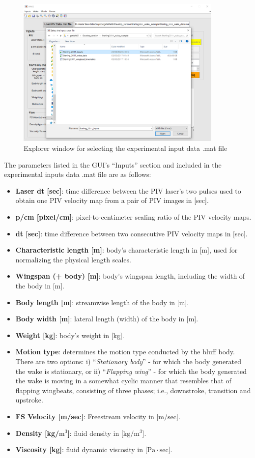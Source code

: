 \documentclass[12pt,a4paper]{article}
\begin{document}
\begin{figure}[ht!]
	\centering
	\includegraphics[width=0.9\textwidth]{select-inputs-mat-file}
	\caption{Explorer window for selecting the experimental input data .mat file}
	\label{fig:GUI-Select-inputs-mat-file}
\end{figure}

\newpage
The parameters listed in the GUI's ``Inputs'' section and included in the experimental inputs data .mat file are as follows:
\begin{itemize}
	\item \textbf{Laser dt [sec]}: time difference between the PIV laser's two pulses used to obtain one PIV velocity map from a pair of PIV images in [sec]. 
	\item \textbf{p/cm [pixel/cm]}: pixel-to-centimeter scaling ratio of the PIV velocity maps.
	\item \textbf{dt [sec]}: time difference between two consecutive PIV velocity maps in [sec].
	\item \textbf{Characteristic length [m]}: body's characteristic length in [m], used for normalizing the physical length scales.
	\item \textbf{Wingspan (+ body) [m]}: body's wingspan length, including the width of the body in [m].
	\item \textbf{Body length [m]}: streamwise length of the body in [m].
	\item \textbf{Body width [m]}: lateral length (width) of the body in [m].
	\item \textbf{Weight [kg]}: body's weight in [kg].
	\item \textbf{Motion type}: determines the motion type conducted by the bluff body. There are two options: i) ``\textit{Stationary body}'' - for which the body generated the wake is stationary, or ii) ``\textit{Flapping wing}'' - for which the body generated the wake is moving in a somewhat cyclic manner that resembles that of flapping wingbeats, consisting of three phases; i.e., downstroke, transition and upstroke.
	\item \textbf{FS Velocity [m/sec]}: Freestream velocity in [m/sec].
	\item \textbf{Density [kg/$\mathrm{m^3}$]}: fluid density in [$\mathrm{kg/m^3}$].
	\item \textbf{Viscosity [kg]}: fluid dynamic viscosity in [$\mathrm{Pa\cdot sec}$].
\end{itemize}
\end{document}
